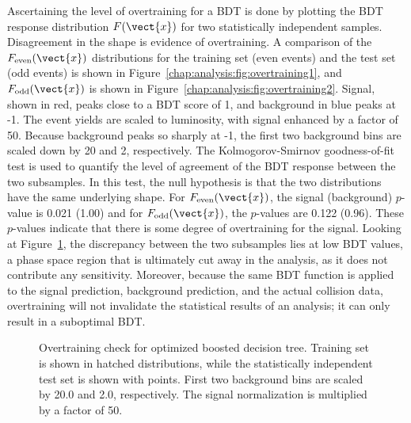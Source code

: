 Ascertaining the level of overtraining for a BDT is done by plotting
the BDT response distribution $F(\vect{x})$ for two statistically
independent samples. Disagreement in the shape is evidence of
overtraining. A comparison of the $F_{\textrm{even}}(\vect{x})$ distributions for the
training set (even events) and the test set (odd events) is
shown in Figure~\ref{chap:analysis:fig:overtraining1}, and
$F_{\textrm{odd}}(\vect{x})$ is shown in
Figure~\ref{chap:analysis:fig:overtraining2}. Signal, shown
in red, peaks close to a BDT score of 1, and background in blue peaks
at -1. The event yields are scaled to luminosity, with signal enhanced
by a factor of 50. Because background peaks so sharply at -1, the
first two background bins are scaled down by 20 and 2,
respectively. The Kolmogorov-Smirnov goodness-of-fit test is used to
quantify the level of agreement of the BDT response between the two
subsamples. In this test, the null hypothesis is that the two
distributions have the same underlying shape. For $F_{\textrm{even}}(\vect{x})$, the signal
(background) $p$-value is 0.021 (1.00) and for $F_{\textrm{odd}}(\vect{x})$, the $p$-values
are 0.122 (0.96). These $p$-values indicate that there is some degree
of overtraining for the signal. Looking at
Figure~\ref{chap:analysis:fig:overtraining}, the discrepancy
between the two subsamples lies at low BDT values, a phase space
region that is ultimately cut away in the analysis, as it does not
contribute any sensitivity. Moreover, because the
same BDT function is applied to the signal prediction, background
prediction, and the actual collision data, overtraining will not
invalidate the statistical results of an analysis; it can only result
in a suboptimal BDT.

\begin{figure}[h]
    \centering
    \caption[Boosted decision tree overtraining check.]{Overtraining
      check for optimized boosted decision tree. Training set is shown
    in hatched distributions, while the statistically independent test set
    is shown with points. First two background bins are scaled by 20.0
    and 2.0, respectively. The signal normalization is multiplied by a factor
    of 50.}
\label{chap:analysis:fig:overtraining}
\end{figure}

